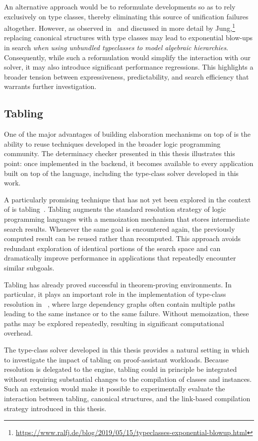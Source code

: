 An alternative approach would be to reformulate developments so as to rely
exclusively on type classes, thereby eliminating this source of unification
failures altogether. However, as observed in~\cite{assia-exp-blow-up} and
discussed in more detail by
Jung,\footnote{\url{https://www.ralfj.de/blog/2019/05/15/typeclasses-exponential-blowup.html}}
replacing canonical structures with type classes may lead to exponential
blow-ups in search \textit{when using unbundled typeclasses to model algebraic
hierarchies}. Consequently, while such a reformulation would simplify the
interaction with our solver, it may also introduce significant performance
regressions. This highlights a broader tension between expressiveness,
predictability, and search efficiency that warrants further investigation.

\subsection{Tabling}

One of the major advantages of building elaboration mechanisms on top of
\elpi is the ability to reuse techniques developed in the broader logic
programming community. The determinacy checker presented in this thesis
illustrates this point: once implemented in the \elpi backend, it becomes
available to every application built on top of the language, including the
type-class solver developed in this work.

A particularly promising technique that has not yet been explored in the
context of \rocqelpi is tabling~\cite{OLD-tabling}. Tabling augments the
standard resolution strategy of logic programming languages with a memoization
mechanism that stores intermediate search results. Whenever the same goal is
encountered again, the previously computed result can be reused rather than
recomputed. This approach avoids redundant exploration of identical portions
of the search space and can dramatically improve performance in applications
that repeatedly encounter similar subgoals.

Tabling has already proved successful in theorem-proving environments. In
particular, it plays an important role in the implementation of type-class
resolution in \lean~\cite{tabling-dm}, where large dependency graphs often
contain multiple paths leading to the same instance or to the same failure.
Without memoization, these paths may be explored repeatedly, resulting in
significant computational overhead.

The type-class solver developed in this thesis provides a natural setting in
which to investigate the impact of tabling on proof-assistant workloads.
Because resolution is delegated to the \elpi engine, tabling could in
principle be integrated without requiring substantial changes to the
compilation of classes and instances. Such an extension would make it possible
to experimentally evaluate the interaction between tabling, canonical
structures, and the link-based compilation strategy introduced in this thesis.

